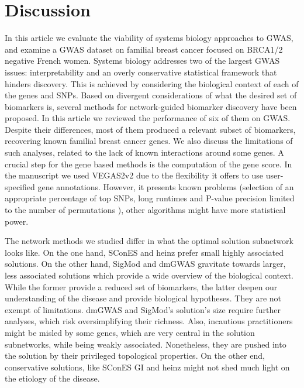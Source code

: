 \documentclass[twocolumn, 10pt]{article}
\begin{document}
\section{Discussion}
\label{sec:orgbfa6dab}

In this article we evaluate the viability of systems biology approaches to GWAS, and examine a GWAS dataset on familial breast cancer focused on BRCA1/2 negative French women. Systems biology addresses two of the largest GWAS issues: interpretability and an overly conservative statistical framework that hinders discovery. This is achieved by considering the biological context of each of the genes and SNPs. Based on divergent considerations of what the desired set of biomarkers is, several methods for network-guided biomarker discovery have been proposed. In this article we reviewed the performance of six of them on GWAS. Despite their differences, most of them produced a relevant subset of biomarkers, recovering known familial breast cancer genes. We also discuss the limitations of such analyses, related to the lack of known interactions around some genes. A crucial step for the gene based methods is the computation of the gene score. In the manuscript we used VEGAS2v2 \cite{mishra_vegas2:_2015} due to the flexibility it offers to use user-specified gene annotations. However, it presents known problems (selection of an appropriate percentage of top SNPs, long runtimes and P-value precision limited to the number of permutations \cite{nakka_gene_2016}), other algorithms might have more statistical power. 

The network methods we studied differ in what the optimal solution subnetwork looks like. On the one hand, SConES and heinz prefer small highly associated solutions. On the other hand, SigMod and dmGWAS gravitate towards larger, less associated solutions which provide a wide overview of the biological context. While the former provide a reduced set of biomarkers, the latter deepen our understanding of the disease and provide biological hypotheses. They are not exempt of limitations. dmGWAS and SigMod's solution's size require further analyses, which risk oversimplifying their richness. Also, incautious practitioners might be misled by some genes, which are very central in the solution subnetworks, while being weakly associated. Nonetheless, they are pushed into the solution by their privileged topological properties. On the other end, conservative solutions, like SConES GI and heinz might not shed much light on the etiology of the disease. 
\end{document}
